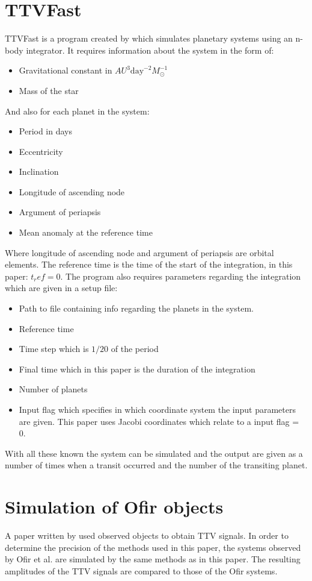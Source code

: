 \documentclass[12pt]{report}
\begin{document}
\section{TTVFast}
\label{TTVFast_method}
	TTVFast is a program created by \cite{2014ApJ...787..132D} which simulates planetary systems using an n-body integrator. It requires information about the system in the form of:
	\begin{itemize}
		\item Gravitational constant in $AU^3 \mathrm{day}^{-2}M_{\odot}^{-1}$
		\item Mass of the star 
	\end{itemize}
	And also for each planet in the system:
	\begin{itemize}
		\item Period in days 
		\item Eccentricity
		\item Inclination 
		\item Longitude of ascending node
		\item Argument of periapsis 
		\item Mean anomaly at the reference time 
	\end{itemize}
	Where longitude of ascending node and argument of periapsis are orbital elements. The reference time is the time of the start of the integration, in this paper: $t_ref=0$. The program also requires parameters regarding the integration which are given in a setup file:
	\begin{itemize}
		\item Path to file containing info regarding the planets in the system.
		\item Reference time
		\item Time step which is $1/20$ of the period
		\item Final time which in this paper is the duration of the integration
		\item Number of planets
		\item Input flag which specifies in which coordinate system the input parameters are given. This paper uses Jacobi coordinates which relate to a input flag = 0.
	\end{itemize}
	With all these known the system can be simulated and the output are given as a number of times when a transit occurred and the number of the transiting planet.
\section{Simulation of Ofir objects}
	A paper written by \cite{2018ApJS..234....9O} used observed objects to obtain TTV signals. In order to determine the precision of the methods used in this paper, the systems observed by Ofir et al. are simulated by the same methods as in this paper. The resulting amplitudes of the TTV signals are compared to those of the Ofir systems.
\end{document}
